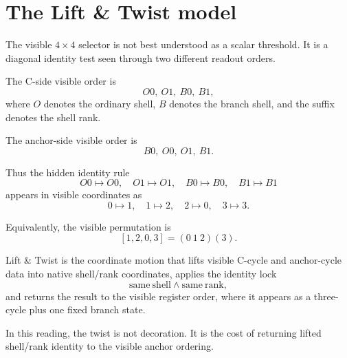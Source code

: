 \section{The Lift \& Twist model}

The visible \(4\times4\) selector is not best understood as a scalar threshold.  It is a diagonal identity test seen through two different readout orders.

The C-side visible order is
\[
    O0,\ O1,\ B0,\ B1,
\]
where \(O\) denotes the ordinary shell, \(B\) denotes the branch shell, and the suffix denotes the shell rank.

The anchor-side visible order is
\[
    B0,\ O0,\ O1,\ B1.
\]

Thus the hidden identity rule
\[
    O0\mapsto O0,\quad
    O1\mapsto O1,\quad
    B0\mapsto B0,\quad
    B1\mapsto B1
\]
appears in visible coordinates as
\[
    0\mapsto 1,\quad
    1\mapsto 2,\quad
    2\mapsto 0,\quad
    3\mapsto 3.
\]

Equivalently, the visible permutation is
\[
    [1,2,0,3] = (0\ 1\ 2)(3).
\]

\begin{definition}
Lift \& Twist is the coordinate motion that lifts visible C-cycle and anchor-cycle data into native shell/rank coordinates, applies the identity lock
\[
    \mathrm{same\ shell} \wedge \mathrm{same\ rank},
\]
and returns the result to the visible register order, where it appears as a three-cycle plus one fixed branch state.
\end{definition}

In this reading, the twist is not decoration.  It is the cost of returning lifted shell/rank identity to the visible anchor ordering.

